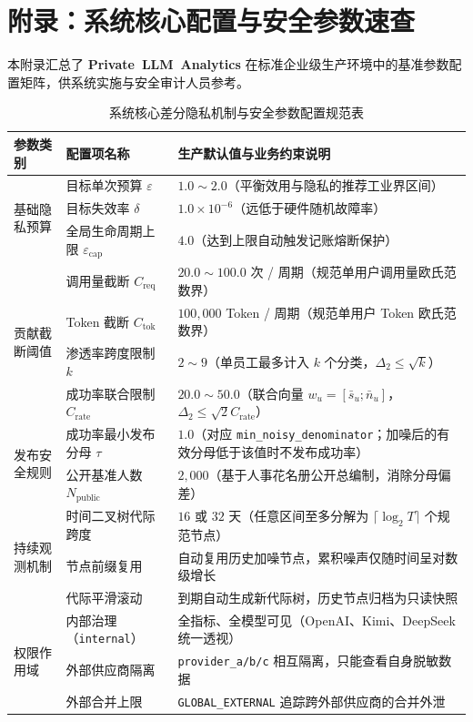 \section{附录：系统核心配置与安全参数速查}
\label{sec:appendix_parameters}

本附录汇总了 \textbf{\mbox{Private LLM Analytics}} 在标准企业级生产环境中的基准参数配置矩阵，供系统实施与安全审计人员参考。

\begin{table}[htbp]
\centering
\small
\caption{系统核心差分隐私机制与安全参数配置规范表}
\label{tab:parameter_reference}
\begin{tabularx}{\textwidth}{ll>{\raggedright\arraybackslash}X}
\toprule
\textbf{参数类别} & \textbf{配置项名称} & \textbf{生产默认值与业务约束说明} \\
\midrule
\multirow{3}{*}{基础隐私预算} 
  & 目标单次预算 $\varepsilon$ & $1.0 \sim 2.0$（平衡效用与隐私的推荐工业界区间） \\
  & 目标失效率 $\delta$ & $1.0 \times 10^{-6}$（远低于硬件随机故障率） \\
  & 全局生命周期上限 $\varepsilon_{\text{cap}}$ & $4.0$（达到上限自动触发记账熔断保护） \\
\midrule
\multirow{4}{*}{贡献截断阈值} 
  & 调用量截断 $C_{\text{req}}$ & $20.0 \sim 100.0$ 次 / 周期（规范单用户调用量欧氏范数界） \\
  & Token 截断 $C_{\text{tok}}$ & $100,000$ Token / 周期（规范单用户 Token 欧氏范数界） \\
  & 渗透率跨度限制 $k$ & $2 \sim 9$（单员工最多计入 $k$ 个分类，$\Delta_2 \le \sqrt{k}$） \\
  & 成功率联合限制 $C_{\text{rate}}$ & $20.0 \sim 50.0$（联合向量 $w_u = [\bar{s}_u; \bar{n}_u]$，$\Delta_2 \le \sqrt{2}C_{\text{rate}}$） \\
\midrule
\multirow{2}{*}{发布安全规则} 
  & 成功率最小发布分母 $\tau$ & $1.0$（对应 \texttt{min\_noisy\_denominator}；加噪后的有效分母低于该值时不发布成功率） \\
  & 公开基准人数 $N_{\text{public}}$ & $2,000$（基于人事花名册公开总编制，消除分母偏差） \\
\midrule
\multirow{3}{*}{持续观测机制} 
  & 时间二叉树代际跨度 & $16$ 或 $32$ 天（任意区间至多分解为 $\lceil \log_2 T \rceil$ 个规范节点） \\
  & 节点前缀复用 & 自动复用历史加噪节点，累积噪声仅随时间呈对数级增长 \\
  & 代际平滑滚动 & 到期自动生成新代际树，历史节点归档为只读快照 \\
\midrule
\multirow{3}{*}{权限作用域} 
  & 内部治理（\texttt{internal}） & 全指标、全模型可见（OpenAI、Kimi、DeepSeek 统一透视） \\
  & 外部供应商隔离 & \texttt{provider\_a/b/c} 相互隔离，只能查看自身脱敏数据 \\
  & 外部合并上限 & \texttt{GLOBAL\_EXTERNAL} 追踪跨外部供应商的合并外泄 \\
\bottomrule
\end{tabularx}
\end{table}

